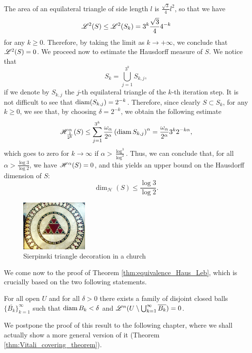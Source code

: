 \begin{example}
The area of an equilateral triangle of side length $l$ is $\frac{\sqrt{3}}{4} l^2$, so that we have
\begin{equation*}
\mathscr{L}^{2}(S) \le \mathscr{L}^{2}(S_{k}) = 3^{k} \frac{\sqrt{3}}{4} 4^{-k}
\end{equation*}
for any $k \ge 0$. Therefore, by taking the limit as $k \to + \infty$, we conclude that $\mathscr{L}^{2}(S) = 0$. We proceed now to estimate the Hausdorff measure of $S$. We notice that $$S_{k} = \bigcup_{j = 1}^{3^{k}} S_{k, j},$$ if we denote by $S_{k, j}$ the $j$-th equilateral triangle of the $k$-th iteration step. It is not difficult to see that $\operatorname{diam}(S_{k, j}) = 2^{-k}$. Therefore, since clearly $S \subset S_{k}$, for any $k \ge 0$, we see that, by choosing $\delta = 2^{-k}$, we obtain the following estimate
\[
\mathscr{H}^{\alpha}_{\frac{1}{2^k}}(S) 
\leq \sum_{j=1}^{3^k}
\frac{\omega_\alpha}{2^\alpha} 
\left(\operatorname{diam} S_{k,j} \right)^\alpha 
= \frac{\omega_\alpha}{2^\alpha} 3^k 2^{-k\alpha},
\]
which goes to zero for $k\to \infty$ if $\alpha >
\frac{\log^3}{\log^2}$. Thus, we can conclude that, for all $\alpha > \frac{\log{3}}{\log{2}}$, we
have $\mathscr{H}^{\alpha}(S) = 0$, and this yields an upper bound on the Hausdorff dimension of $S$:
\[
\dim_{\mathcal{H}}(S) \leq \frac{\log 3}{\log 2}.
\]

\begin{figure}[!ht]
\caption{Sierpinski triangle decoration in a church}
\centering
\includegraphics[width=0.3\textwidth]{sierpinski_triangle_decoration.jpg}
\end{figure}
\end{example}

We come now to the proof of Theorem \ref{thm:equivalence_Haus_Leb}, which is crucially based on the two following statements.

\begin{lemma}
\label{lemmaVitaliCovering}
For all open $U$ and for all $\delta > 0$ there exists a family of disjoint
closed balls $\{\overline{B_k}\}_{k=1}^\infty$ such that $\operatorname{diam} B_k < \delta$ and
$\mathscr{L}^{n}(U \setminus \bigcup_{k=1}^\infty \overline{B_k}) = 0$.
\end{lemma}
We postpone the proof of this result to the following chapter, where we shall actually show a more general version of it (Theorem \ref{thm:Vitali_covering_theorem}).

